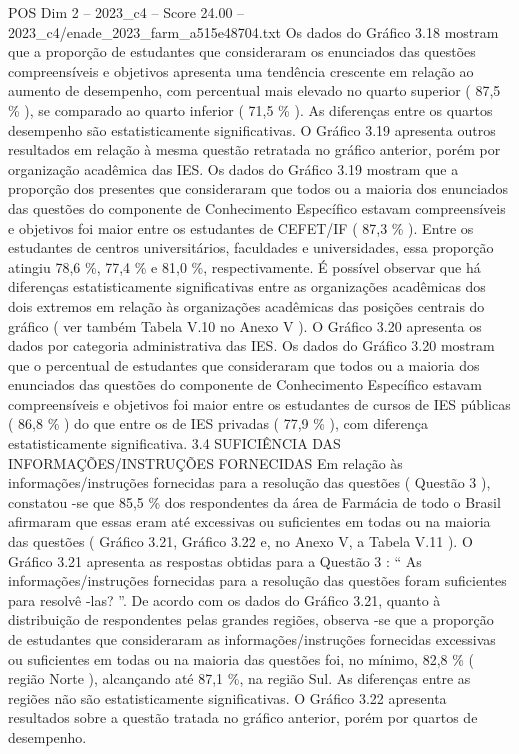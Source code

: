 \begin{textsample}{POS Dim 2 – 2023\_c4 – Score 24.00 – 2023\_c4/enade\_2023\_farm\_a515e48704.txt}
Os dados do Gráfico 3.18 mostram que a proporção de estudantes que consideraram os enunciados das questões compreensíveis e objetivos apresenta uma tendência crescente em relação ao aumento de desempenho, com percentual mais elevado no quarto superior ( 87,5 \% ), se comparado ao quarto inferior ( 71,5 \% ).
As diferenças entre os quartos desempenho são estatisticamente significativas.
O Gráfico 3.19 apresenta outros resultados em relação à mesma questão retratada no gráfico anterior, porém por organização acadêmica das IES.
Os dados do Gráfico 3.19 mostram que a proporção dos presentes que consideraram que todos ou a maioria dos enunciados das questões do componente de Conhecimento Específico estavam compreensíveis e objetivos foi maior entre os estudantes de CEFET/IF ( 87,3 \% ).
Entre os estudantes de centros universitários, faculdades e universidades, essa proporção atingiu 78,6 \%, 77,4 \% e 81,0 \%, respectivamente.
É possível observar que há diferenças estatisticamente significativas entre as organizações acadêmicas dos dois extremos em relação às organizações acadêmicas das posições centrais do gráfico ( ver também Tabela V.10 no Anexo V ).
O Gráfico 3.20 apresenta os dados por categoria administrativa das IES.
Os dados do Gráfico 3.20 mostram que o percentual de estudantes que consideraram que todos ou a maioria dos enunciados das questões do componente de Conhecimento Específico estavam compreensíveis e objetivos foi maior entre os estudantes de cursos de IES públicas ( 86,8 \% ) do que entre os de IES privadas ( 77,9 \% ), com diferença estatisticamente significativa. 3.4 SUFICIÊNCIA DAS INFORMAÇÕES/INSTRUÇÕES FORNECIDAS Em relação às informações/instruções fornecidas para a resolução das questões ( Questão 3 ), constatou -se que 85,5 \% dos respondentes da área de Farmácia de todo o Brasil afirmaram que essas eram até excessivas ou suficientes em todas ou na maioria das questões ( Gráfico 3.21, Gráfico 3.22 e, no Anexo V, a Tabela V.11 ).
O Gráfico 3.21 apresenta as respostas obtidas para a Questão 3 : “ As informações/instruções fornecidas para a resolução das questões foram suficientes para resolvê -las? ”.
De acordo com os dados do Gráfico 3.21, quanto à distribuição de respondentes pelas grandes regiões, observa -se que a proporção de estudantes que consideraram as informações/instruções fornecidas excessivas ou suficientes em todas ou na maioria das questões foi, no mínimo, 82,8 \% ( região Norte ), alcançando até 87,1 \%, na região Sul.
As diferenças entre as regiões não são estatisticamente significativas.
O Gráfico 3.22 apresenta resultados sobre a questão tratada no gráfico anterior, porém por quartos de desempenho.

\end{textsample}
